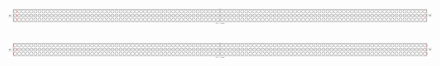 \documentclass[first,firstsupp,lastsupp,last,hyperref,table]{ETHclass}
\begin{document}
\begin{frame}
\begin{columns}[c]
\begin{column}{0.5\textwidth}
\begin{figure}
\end{figure}
\end{column}
\end{columns}
\centering
\begin{figure}
\centering
\includegraphics[width=1.05\textwidth]{twofibers-sameside-crackshielding101.pdf}
\end{figure}
\vspace{-0.35cm}
\begin{figure}
\centering
\includegraphics[width=1.05\textwidth]{twofibers-oppositeside-crackshielding101.pdf}
\end{figure}
\end{frame}

\addtocounter{framenumber}{-1}
\end{document}
